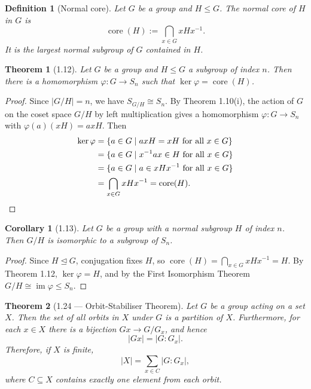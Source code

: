 \documentclass[12pt]{article}
\newtheorem{theorem}{Theorem}
\newtheorem{corollary}{Corollary}
\newtheorem{definition}{Definition}
\begin{document}
\begin{definition}[Normal core]
Let $G$ be a group and $H \leq G$. The \emph{normal core} of $H$ in $G$ is
\[
  \operatorname{core}(H) := \bigcap_{x \in G} xHx^{-1}.
\]
It is the largest normal subgroup of $G$ contained in $H$.
\end{definition}

\begin{theorem}[1.12]
Let $G$ be a group and $H \leq G$ a subgroup of index $n$. Then there is a homomorphism $\varphi : G \to S_n$ such that $\ker\varphi = \operatorname{core}(H)$.
\end{theorem}

\begin{proof}
Since $|G/H| = n$, we have $S_{G/H} \cong S_n$. By Theorem 1.10(i), the action of $G$ on the coset space $G/H$ by left multiplication gives a homomorphism $\varphi : G \to S_n$ with $\varphi(a)(xH) = axH$. Then
\begin{align*}
  \ker\varphi &= \{a \in G \mid axH = xH \text{ for all } x \in G\} \\
              &= \{a \in G \mid x^{-1}ax \in H \text{ for all } x \in G\} \\
              &= \{a \in G \mid a \in xHx^{-1} \text{ for all } x \in G\} \\
              &= \bigcap_{x \in G} xHx^{-1} = \operatorname{core}(H). \qedhere
\end{align*}
\end{proof}

\begin{corollary}[1.13]
Let $G$ be a group with a normal subgroup $H$ of index $n$. Then $G/H$ is isomorphic to a subgroup of $S_n$.
\end{corollary}

\begin{proof}
Since $H \trianglelefteq G$, conjugation fixes $H$, so $\operatorname{core}(H) = \bigcap_{x \in G} xHx^{-1} = H$. By Theorem 1.12, $\ker\varphi = H$, and by the First Isomorphism Theorem $G/H \cong \operatorname{im}\varphi \leq S_n$.
\end{proof}


\begin{theorem}[1.24 — Orbit-Stabiliser Theorem]
Let $G$ be a group acting on a set $X$. Then the set of all orbits in $X$ under $G$ is a partition of $X$. Furthermore, for each $x \in X$ there is a bijection $Gx \to G/G_x$, and hence
\[
  |Gx| = |G : G_x|.
\]
Therefore, if $X$ is finite,
\[
  |X| = \sum_{x \in C} |G : G_x|,
\]
where $C \subseteq X$ contains exactly one element from each orbit.
\end{theorem}
\end{document}

